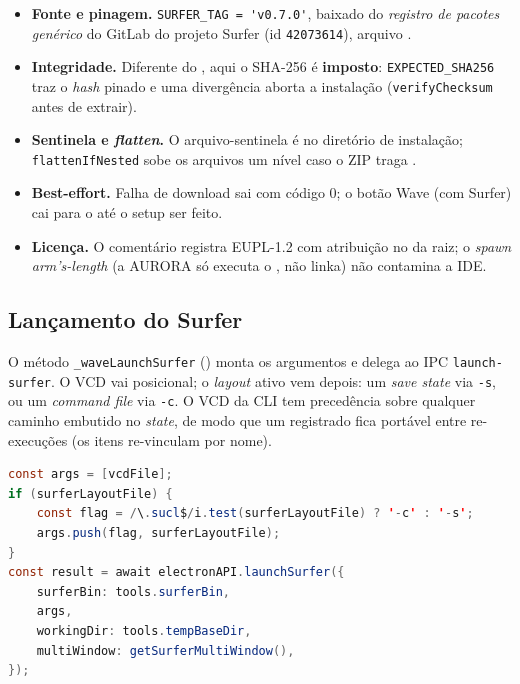\begin{itemize}
  \item \textbf{Fonte e pinagem.} \lstinline|SURFER_TAG = 'v0.7.0'|, baixado do
        \emph{registro de pacotes genérico} do GitLab do projeto Surfer (id
        \lstinline|42073614|), arquivo .
  \item \textbf{Integridade.} Diferente do , aqui o SHA-256 é
        \textbf{imposto}: \lstinline|EXPECTED_SHA256| traz o \emph{hash} pinado e
        uma divergência aborta a instalação (\lstinline|verifyChecksum| antes de
        extrair).
  \item \textbf{Sentinela e \emph{flatten}.} O arquivo-sentinela é
         no diretório de instalação; \lstinline|flattenIfNested|
        sobe os arquivos um nível caso o ZIP traga .
  \item \textbf{Best-effort.} Falha de download sai com código 0; o botão Wave
        (com Surfer) cai para o  até o setup ser feito.
  \item \textbf{Licença.} O comentário registra EUPL-1.2 com atribuição no
         da raiz; o \emph{spawn} \emph{arm's-length} (a AURORA só
        executa o , não linka) não contamina a IDE.
\end{itemize}

\subsection{Lançamento do Surfer}
\label{sec:cap10-surfer-launch}

O método \lstinline|_waveLaunchSurfer| () monta os
argumentos e delega ao IPC \lstinline|launch-surfer|. O VCD vai posicional; o
\emph{layout} ativo vem depois: um \emph{save state}  via
\lstinline|-s|, ou um \emph{command file}  via \lstinline|-c|. O VCD da
CLI tem precedência sobre qualquer caminho embutido no \emph{state}, de modo que um
 registrado fica portável entre re-execuções (os itens re-vinculam por
nome).

\begin{lstlisting}[language=Java,caption={Montagem de argumentos do Surfer (\_waveLaunchSurfer).}]
const args = [vcdFile];
if (surferLayoutFile) {
    const flag = /\.sucl$/i.test(surferLayoutFile) ? '-c' : '-s';
    args.push(flag, surferLayoutFile);
}
const result = await electronAPI.launchSurfer({
    surferBin: tools.surferBin,
    args,
    workingDir: tools.tempBaseDir,
    multiWindow: getSurferMultiWindow(),
});
\end{lstlisting}

